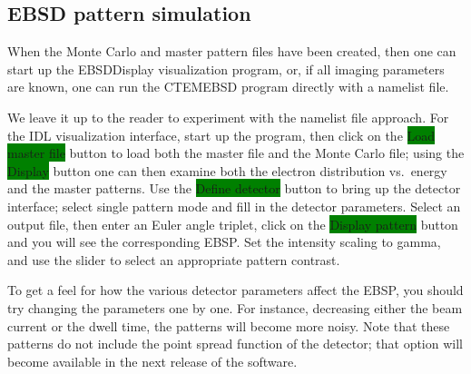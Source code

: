 \documentclass[DIV=calc, paper=letter, fontsize=11pt]{scrartcl}	 %
\newcommand{\button}[1]{\colorbox{green}{\textsf{#1}} button}
\begin{document}
\subsection{EBSD pattern simulation}
When the Monte Carlo and master pattern files have been created, then one can start up the 
\textsf{EBSDDisplay} visualization program, or, if all imaging parameters are known, one can
run the \textsf{CTEMEBSD} program directly with a namelist file.

We leave it up to the reader to experiment with the namelist file approach.  For the IDL visualization interface, 
start up the program, then click on the \button{Load master file} to load both the master file and the Monte Carlo
file; using the \button{Display} one can then examine both the electron distribution vs.\ energy and the master
patterns.  Use the \button{Define detector} to bring up the detector interface; select \textsf{single pattern} mode
and fill in the detector parameters.  Select an output file, then enter an Euler angle triplet, click on the
\button{Display pattern} and you will see the corresponding EBSP.  Set the intensity scaling to gamma, and 
use the slider to select an appropriate pattern contrast.

To get a feel for how the various detector parameters affect the EBSP, you should try changing the parameters 
one by one.  For instance, decreasing either the beam current or the dwell time, the patterns will become more
noisy.  Note that these patterns do not include the point spread function of the detector; that option will become 
available in the next release of the software.
\end{document}

